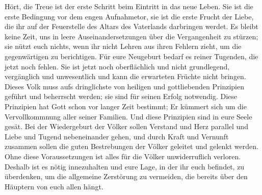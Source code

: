 Hört, die Treue ist der erste Schritt beim Eintritt in das neue Leben. Sie ist die erste Bedingung vor dem engen Aufnahmetor, sie ist die erste Frucht der Liebe, die ihr auf der Feuerstelle des Altars des Vaterlands darbringen werdet. Es bleibt keine Zeit, uns in leere Auseinandersetzungen über die Vergangenheit zu stürzen; sie nützt euch nichts, wenn ihr nicht Lehren aus ihren Fehlern zieht, um die gegenwärtigen zu berichtigen. Für eure Neugeburt bedarf es reiner Tugenden, die jetzt noch fehlen. Sie ist jetzt noch oberflächlich und nicht grundlegend, vergänglich und unwesentlich und kann die erwarteten Früchte nicht bringen. Dieses Volk muss aufs dringlichste von heiligen und gottliebenden Prinzipien geführt und beherrscht werden; sie sind für seinen Erfolg notwendig. Diese Prinzipien hat Gott schon vor langer Zeit bestimmt; Er kümmert sich um die Vervollkommnung aller seiner Familien. Und diese Prinzipien sind in eure Seele gesät. Bei der Wiedergeburt der Völker sollen Verstand und Herz parallel und Liebe und Tugend nebeneinander gehen, und durch Kraft und Vernunft zusammen sollen die guten Bestrebungen der Völker geleitet und gelenkt werden. Ohne diese Voraussetzungen ist alles für die Völker unwiderruflich verloren. Deshalb ist es nötig innezuhalten und eure Lage, in der ihr euch befindet, zu überdenken, um die allgemeine Zerstörung zu vermeiden, die bereits über den Häuptern von euch allen hängt. 

